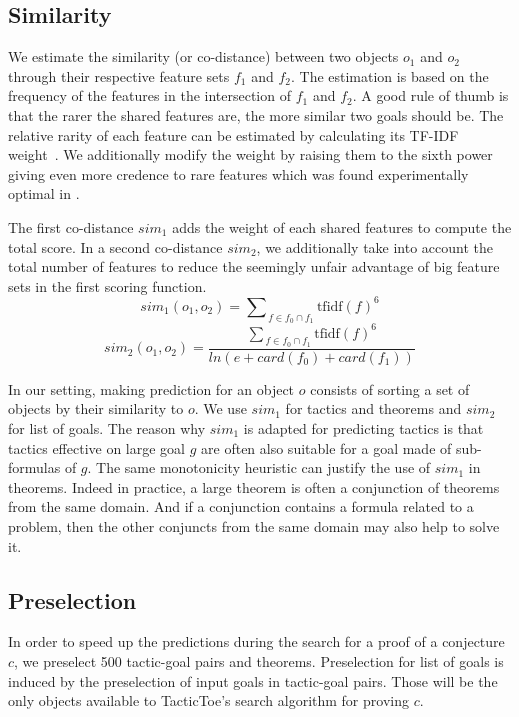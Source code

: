 \documentclass[runningheads,a4paper,draft]{svjour3}
\def\tactictoe{\textsf{TacticToe}\xspace}
\begin{document}
\subsection{Similarity}\label{sec:predictions}
We estimate the similarity (or co-distance) between two objects $o_1$ and $o_2$ 
through their respective feature sets $f_1$ and $f_2$.
The estimation is based on the frequency of the features in the intersection of 
$f_1$ and $f_2$. A good rule of thumb is that the rarer the shared features 
are, the more similar two goals should be. The relative rarity of each feature 
can be estimated by calculating its TF-IDF weight~\cite{Jones72astatistical}.
We additionally modify the weight by raising them to the sixth power giving 
even more credence 
to rare features which was found experimentally optimal in \cite{}.

The first co-distance $sim_1$ adds the weight of each shared 
features to compute the total score.
In a second co-distance $sim_2$, we additionally take into account 
the total number of features to reduce the seemingly unfair advantage of big 
feature sets in the first scoring function.
\[sim_1 (o_1, o_2) = {\sum\nolimits_{\,f \in f_0 \cap 
f_1}{\text{tfidf}(f)^{6}}}\]
\[sim_2 (o_1, o_2) = \frac{{\sum\nolimits_{\,f \in f_0 \cap 
f_1}{\text{tfidf}(f)^{6}}}}
{ln (e + card(f_0) + card(f_1))}\]

In our setting, making prediction for an object $o$ consists of sorting a set 
of objects by their similarity to $o$. We use $sim_1$ for tactics and theorems 
and $sim_2$ for list of goals. The reason why $sim_1$ is adapted for
predicting tactics is that tactics effective on large goal $g$ are often also  
suitable for a goal made of sub-formulas of $g$. The same monotonicity 
heuristic can justify the use of $sim_1$ in theorems. Indeed in practice, a 
large theorem is often a conjunction of theorems from the same domain. 
And if a conjunction contains a formula related to a problem, then the other 
conjuncts from the same domain may also help to solve it.

\subsection{Preselection}\label{sec:dependencies}

In order to speed up the predictions during the search for a proof of a 
conjecture $c$, we preselect 500 tactic-goal pairs and theorems. 
Preselection for list of goals is induced by the preselection of input 
goals in tactic-goal pairs. Those will be the only objects available to 
\tactictoe's search algorithm for proving $c$.
\end{document}
